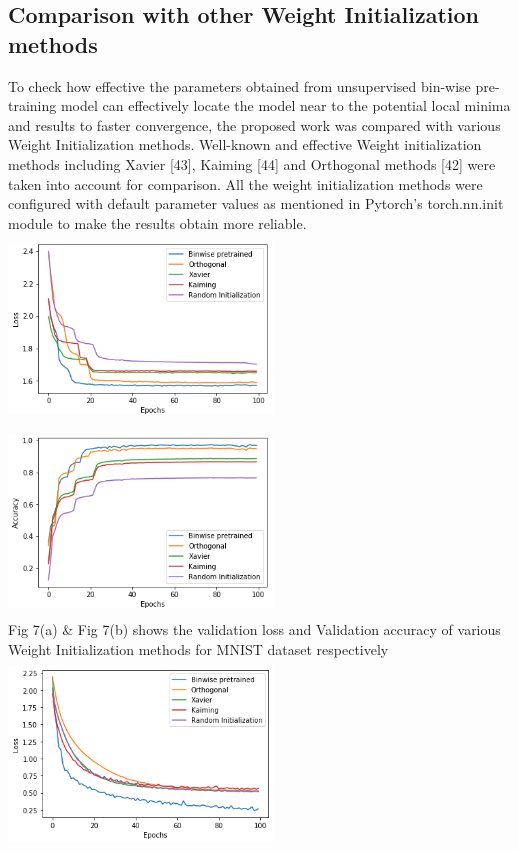\documentclass{article}
\begin{document}
\subsection{Comparison with other Weight Initialization methods}
To check how effective the parameters obtained from unsupervised bin-wise pre-training
model can effectively locate the model near to the potential local minima and results to
faster convergence, the proposed work was compared with various Weight Initialization
methods. Well-known and effective Weight initialization methods including Xavier [43],
Kaiming [44] and Orthogonal methods [42] were taken into account for comparison. All the weight initialization methods were configured with default parameter values as mentioned in Pytorch's torch.nn.init module to make the results obtain more reliable.
\\
\vspace{4cm} 
\includegraphics[width= 7cm, height=5cm]{fig1.png}
\includegraphics[width= 7cm, height=5cm]{fig2.png}
\\
Fig 7(a) \& Fig 7(b) shows the validation loss and Validation accuracy of various Weight Initialization methods for MNIST dataset respectively
\\
\includegraphics[width= 7cm, height=5cm]{fig5.png}
\end{document}
